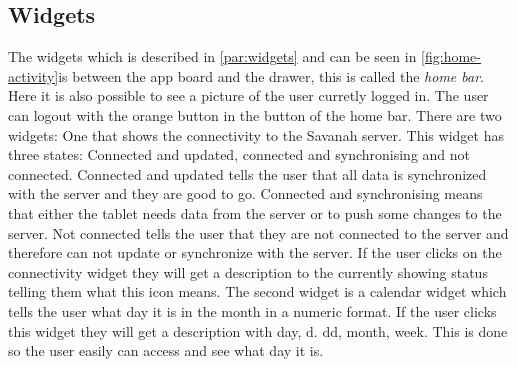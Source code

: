 \subsection{Widgets}
The widgets which is described in \autoref{par:widgets} and can be seen in \autoref{fig:home-activity}is between the app board and the drawer, this is called the \textit{home bar}. Here it is also possible to see a picture of the user curretly logged in. The user can logout with the orange button in the button of the home bar. There are two widgets: One that shows the connectivity to the Savanah server. This widget has three states: Connected and updated, connected and synchronising and not connected. Connected and updated tells the user that all data is synchronized with the server and they are good to go. Connected and synchronising means that either the tablet needs data from the server or to push some changes to the server. Not connected tells the user that they are not connected to the server and therefore can not update or synchronize with the server.
If the user clicks on the connectivity widget they will get a description to the currently showing status telling them what this icon means.
The second widget is a calendar widget which tells the user what day it is in the month in a numeric format. If the user clicks this widget they will get a description with day, d. dd, month, week. This is done so the user easily can access and see what day it is.


\begin{lstlisting}[style=sourceCode, language=JAVA, caption=This is code, label=lst:homeActivity] 
\end{lstlisting}